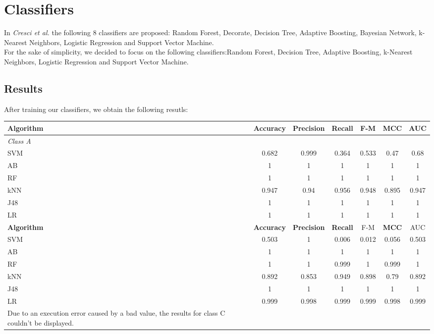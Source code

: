 \documentclass[a4paper,11pt]{article}
\begin{document}
\section{Classifiers}
In \textit{Cresci et al.} the following 8 classifiers are proposed: Random Forest, Decorate, Decision Tree, Adaptive Boosting, Bayesian Network, k-Nearest Neighbors, Logistic Regression and Support Vector Machine.\\

For the sake of simplicity, we decided to focus on the following classifiers:Random Forest,  Decision Tree, Adaptive Boosting, k-Nearest Neighbors, Logistic Regression and Support Vector Machine.\\

\subsection{Results}
After training our classifiers, we obtain the following resutls:

\begin{tabular}{lcccccc}
	\hline
	\textbf{Algorithm} 	& \textbf{Accuracy} 	& \textbf{Precision} & \textbf{Recall} & F-M 	& \textbf{MCC} & AUC\\
	\hline
	\textit{Class A}\\
	SVM			&	0.682	&	0.999	&	0.364	&0.533 & 0.47 & 0.68\\
	AB			&	1		&	1		&	1		& 1 	&	1	& 1   \\
	RF			&	1		&	1		&	1		& 1   	&	1	& 1  \\
	kNN			&	0.947	&	0.94	&	0.956	& 0.948 & 0.895 & 0.947\\
	J48			&	1		&	1		&	1		& 1 	&	1	& 1   \\
	LR			&	1		&	1		&	1		& 1 	&	1	& 1   \\
	\hline
	\textbf{Algorithm} 	& \textbf{Accuracy} 	& \textbf{Precision} & \textbf{Recall} & F-M 	& \textbf{MCC} & AUC\\
	\hline
	SVM			&	0.503	&	1	&	0.006	& 0.012 & 0.056 & 0.503\\
	AB			&	1		&	1		&	1		& 1 	&	1	& 1   \\
	RF			&	1		&	1		&	0.999		& 1   	&	0.999	& 1  \\
	kNN			&	0.892	&	0.853	&	0.949	& 0.898 & 0.79 & 0.892\\
	J48			&	1		&	1		&	1		& 1 	&	1	& 1   \\
	LR			&	0.999		&	0.998		&	0.999		& 0.999 	&	0.998	& 0.999   \\
	
	Due to an execution error caused by a bad value, the results for class C couldn't be displayed.
	
\end{tabular}
\end{document}
